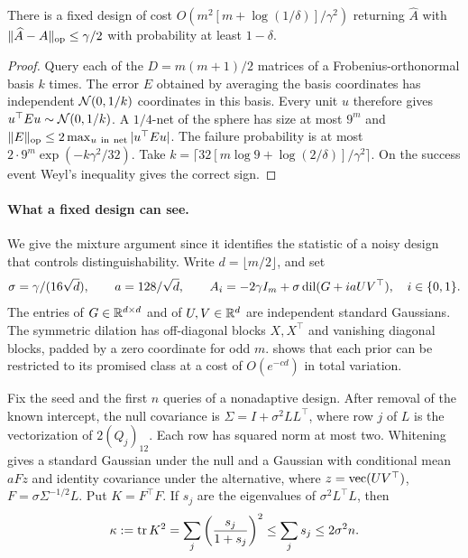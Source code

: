 \begin{lemma}\label{lem:reconstruct}
There is a fixed design of cost \(O(m^2[m+\log(1/\delta)]/\gamma^2)\) returning \(\widehat A\) with \(\|\widehat A-A\|_{\mathrm{op}}\le\gamma/2\) with probability at least \(1-\delta\).
\end{lemma}
\begin{proof}
Query each of the \(D=m(m+1)/2\) matrices of a Frobenius-orthonormal basis \(k\) times. The error \(E\) obtained by averaging the basis coordinates has independent \(\mathcal N(0,1/k)\) coordinates in this basis. Every unit \(u\) therefore gives \(u^\top E u\sim\mathcal N(0,1/k)\). A \(1/4\)-net of the sphere has size at most \(9^m\) and \(\|E\|_{\op}\le2\max_{u\ \mathrm{in\ net}}|u^\top E u|\). The failure probability is at most \(2\cdot9^m\exp(-k\gamma^2/32)\). Take \(k=\lceil32[m\log9+\log(2/\delta)]/\gamma^2\rceil\). On the success event Weyl's inequality gives the correct sign.
\end{proof}

\paragraph{What a fixed design can see.}
We give the mixture argument since it identifies the statistic of a noisy design that controls distinguishability. Write \(d=\lfloor m/2\rfloor\), and set
\[
 \sigma=\gamma/(16\sqrt d),\qquad a=128/\sqrt d,\qquad
 A_i=-2\gamma I_m+\sigma\operatorname{dil}(G+i aUV^\top),\quad i\in\{0,1\}.
\]
The entries of \(G\in\mathbb R^{d\times d}\) and of \(U,V\in\mathbb R^d\) are independent standard Gaussians. The symmetric dilation has off-diagonal blocks \(X,X^\top\) and vanishing diagonal blocks, padded by a zero coordinate for odd \(m\).  shows that each prior can be restricted to its promised class at a cost of \(O(e^{-cd})\) in total variation.

Fix the seed and the first \(n\) queries of a nonadaptive design. After removal of the known intercept, the null covariance is \(\Sigma=I+\sigma^2LL^\top\), where row \(j\) of \(L\) is the vectorization of \(2(Q_j)_{12}\). Each row has squared norm at most two. Whitening gives a standard Gaussian under the null and a Gaussian with conditional mean \(aFz\) and identity covariance under the alternative, where \(z=\operatorname{vec}(UV^\top)\), \(F=\sigma\Sigma^{-1/2}L\). Put \(K=F^\top F\). If \(s_j\) are the eigenvalues of \(\sigma^2L^\top L\), then
\begin{equation}\label{eq:softGram}
 \kappa:=\operatorname{tr} K^2
   =\sum_j\left(\frac{s_j}{1+s_j}\right)^2
   \le\sum_j s_j \le 2\sigma^2n .
\end{equation}

